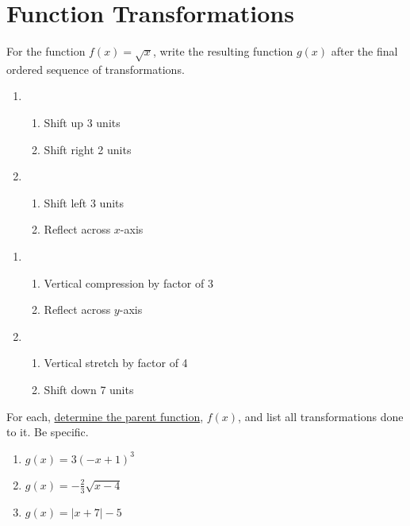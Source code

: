\chapter{Function Transformations}

For the function $f(x) = \sqrt{x}$, write the resulting function $g(x)$ after the final ordered sequence of transformations.

\begin{multicols}{2}
\begin{enumerate}
	\item 
		\begin{enumerate}[(1)]
			\item Shift up 3 units
			\item Shift right 2 units
		\end{enumerate}
	\item 
		\begin{enumerate}[(1)]
			\item Shift left 3 units
			\item Reflect across $x$-axis
		\end{enumerate}
\end{enumerate}	\setcounter{Review}{\value{enumi}}
\end{multicols}

\begin{multicols}{2}
\begin{enumerate}		\setcounter{enumi}{\value{Review}}
	\item 
		\begin{enumerate}[(1)]
			\item Vertical compression by factor of 3
			\item Reflect across $y$-axis
		\end{enumerate}
	\item 
		\begin{enumerate}[(1)]
			\item Vertical stretch by factor of 4
			\item Shift down 7 units
		\end{enumerate}
\end{enumerate}	\setcounter{Review}{\value{enumi}}
\end{multicols}

For each, \underline{determine the parent function}, $f(x)$, and list all transformations done to it. Be specific.
\begin{multicols}{3}
\begin{enumerate}	\setcounter{enumi}{\value{Review}}
	\item $g(x) = 3(-x+1)^3$
	\item $g(x) = -\frac{2}{3}\sqrt{x-4}$
	\item $g(x) = |x+7|-5$
\end{enumerate}	\setcounter{Review}{\value{enumi}}
\end{multicols}

